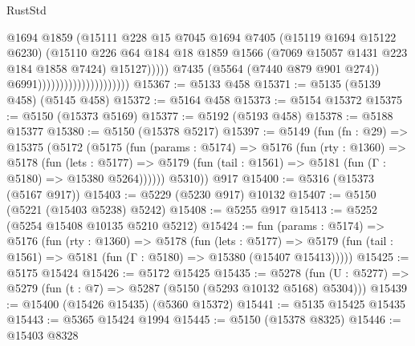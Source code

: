 \begin{lexlean}{RustStd}
\begin{coremodule}
                                                    @1694
                                                    @1859
                                                    (@15111
                                                      @228
                                                      @15
                                                      @7045
                                                      @1694
                                                      @7405
                                                      (@15119 @1694 @15122 @6230)
                                                      (@15110
                                                        @226
                                                        @64
                                                        @184
                                                        @18
                                                        @1859
                                                        @1566
                                                        (@7069 @15057 @1431 @223 @184 @1858 @7424)
                                                        @15127)))))
                                              @7435
                                              (@5564 (@7440 @879 @901 @274))
                                              @6991)))))))))))))))))))))
@15367 := @5133 @458
@15371 := @5135 (@5139 @458) (@5145 @458)
@15372 := @5164 @458
@15373 := @5154 @15372
@15375 := @5150 (@15373 @5169)
@15377 := @5192 (@5193 @458)
@15378 := @5188 @15377
@15380 := @5150 (@15378 @5217)
@15397 := @5149
    (fun (fn : @29) =>
    @15375
      (@5172
        (@5175
          (fun (params : @5174) =>
          @5176
            (fun (rty : @1360) =>
            @5178
              (fun (lets : @5177) =>
              @5179 (fun (tail : @1561) => @5181 (fun (Γ : @5180) => @15380 @5264))))))
        @5310))
    @917
@15400 := @5316 (@15373 (@5167 @917))
@15403 := @5229 (@5230 @917) @10132
@15407 := @5150 (@5221 (@15403 @5238) @5242)
@15408 := @5255 @917
@15413 := @5252 (@5254 @15408 @10135 @5210 @5212)
@15424 := fun (params : @5174) =>
  @5176
    (fun (rty : @1360) =>
    @5178
      (fun (lets : @5177) =>
      @5179 (fun (tail : @1561) => @5181 (fun (Γ : @5180) => @15380 (@15407 @15413)))))
@15425 := @5175 @15424
@15426 := @5172 @15425
@15435 := @5278
    (fun (U : @5277) => @5279 (fun (t : @7) => @5287 (@5150 (@5293 @10132 @5168) @5304)))
@15439 := @15400 (@15426 @15435) (@5360 @15372)
@15441 := @5135 @15425 @15435
@15443 := @5365 @15424 @1994
@15445 := @5150 (@15378 @8325)
@15446 := @15403 @8328

\end{coremodule}
\end{lexlean}
